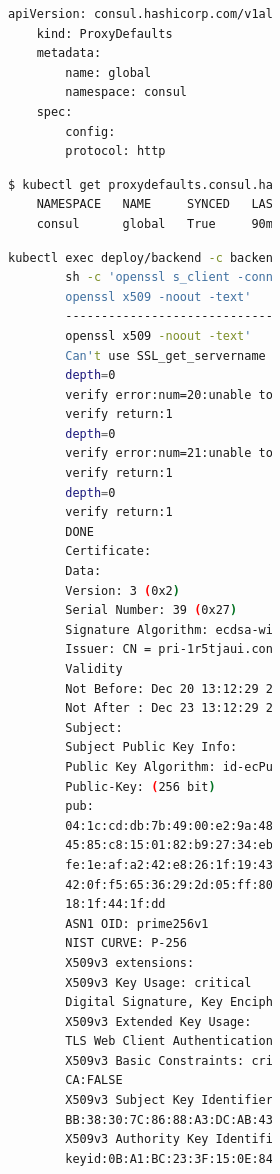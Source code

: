 \documentclass[12pt,a4paper]{report}
\begin{document}
\begin{figure}[h]
\begin{figure}[h]
\begin{figure}[h]
	\hspace{0.3cm}{Với luật này, chúng ta cho phép service backend được kết nối tới service frontend. Tuy nhiên, đến đây vẫn chưa xong, vì mặc định của proxy là giao tiếp thông qua giao thức tcp, mà ứng dụng frontend và backend giao tiếp thông qua giao thức http. Vì vậy, chúng ta cần cài đặt lại để cho proxy nhận truy cập http. Để cấu hình, chúng ta cần tạo 1 tệp tin với nội dung như sau:}
	\begin{lstlisting}[language=Bash]
	apiVersion: consul.hashicorp.com/v1alpha1
	kind: ProxyDefaults
	metadata:
		name: global
		namespace: consul
	spec:
		config:
		protocol: http
	\end{lstlisting}
	\hspace{1.0cm}{Sau khi cấu hình xong, chạy lệnh sau để kiểm tra:}
	\begin{lstlisting}[language=Bash]
	$ kubectl get proxydefaults.consul.hashicorp.com  -A
	NAMESPACE   NAME     SYNCED   LAST SYNCED   AGE
	consul      global   True     90m           90m
	\end{lstlisting}
	\hspace{1.0cm}{Như vậy, với status là synced, thì có nghĩa là ứng dụng đã có thể giao tiếp với nhau thông qua giao thức http.}
	
	\hspace{0.3cm}{Tiếp theo đấy, chúng ta sẽ kiểm tra xem thông tin chứng chỉ mà Consul tạo ra cho ứng dụng. Để kiểm tra, đầu tiên chúng ta cần truy cập được vào trong container ứng dụng với câu lệnh sau:}
	\begin{lstlisting}[language=Bash]
		kubectl exec deploy/backend -c backend -- \
		sh -c 'openssl s_client -connect $(hostname -i):20000 | \
		openssl x509 -noout -text'
		--------------------------------------------
		openssl x509 -noout -text'
		Can't use SSL_get_servername
		depth=0
		verify error:num=20:unable to get local issuer certificate
		verify return:1
		depth=0
		verify error:num=21:unable to verify the first certificate
		verify return:1
		depth=0
		verify return:1
		DONE
		Certificate:
		Data:
		Version: 3 (0x2)
		Serial Number: 39 (0x27)
		Signature Algorithm: ecdsa-with-SHA256
		Issuer: CN = pri-1r5tjaui.consul.ca.562ec48b.consul
		Validity
		Not Before: Dec 20 13:12:29 2022 GMT
		Not After : Dec 23 13:12:29 2022 GMT
		Subject:
		Subject Public Key Info:
		Public Key Algorithm: id-ecPublicKey
		Public-Key: (256 bit)
		pub:
		04:1c:cd:db:7b:49:00:e2:9a:48:97:71:31:88:32:
		45:85:c8:15:01:82:b9:27:34:eb:0b:a0:63:02:7d:
		fe:1e:af:a2:42:e8:26:1f:19:43:2a:51:d5:bf:46:
		42:0f:f5:65:36:29:2d:05:ff:80:d4:23:93:49:00:
		18:1f:44:1f:dd
		ASN1 OID: prime256v1
		NIST CURVE: P-256
		X509v3 extensions:
		X509v3 Key Usage: critical
		Digital Signature, Key Encipherment, Data Encipherment, Key Agreement
		X509v3 Extended Key Usage:
		TLS Web Client Authentication, TLS Web Server Authentication
		X509v3 Basic Constraints: critical
		CA:FALSE
		X509v3 Subject Key Identifier:
		BB:38:30:7C:86:88:A3:DC:AB:43:69:77:6B:B9:43:95:81:D1:25:47:E4:FA:9C:D6:AB:C2:A1:FE:99:51:FA:F7
		X509v3 Authority Key Identifier:
		keyid:0B:A1:BC:23:3F:15:0E:84:6B:32:30:E2:03:42:68:1B:2B:99:FF:7F:78:F1:71:0B:9D:70:5A:C0:F0:DE:66:A0
		

\end{lstlisting}
\end{figure}
\end{figure}
\end{figure}
\end{document}
